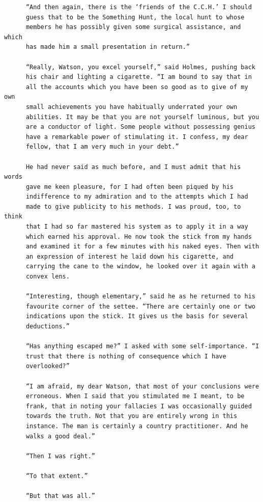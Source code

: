 \documentclass{article}
\begin{document}
\begin{verbatim}
      “And then again, there is the ‘friends of the C.C.H.’ I should
      guess that to be the Something Hunt, the local hunt to whose
      members he has possibly given some surgical assistance, and which
      has made him a small presentation in return.”

      “Really, Watson, you excel yourself,” said Holmes, pushing back
      his chair and lighting a cigarette. “I am bound to say that in
      all the accounts which you have been so good as to give of my own
      small achievements you have habitually underrated your own
      abilities. It may be that you are not yourself luminous, but you
      are a conductor of light. Some people without possessing genius
      have a remarkable power of stimulating it. I confess, my dear
      fellow, that I am very much in your debt.”

      He had never said as much before, and I must admit that his words
      gave me keen pleasure, for I had often been piqued by his
      indifference to my admiration and to the attempts which I had
      made to give publicity to his methods. I was proud, too, to think
      that I had so far mastered his system as to apply it in a way
      which earned his approval. He now took the stick from my hands
      and examined it for a few minutes with his naked eyes. Then with
      an expression of interest he laid down his cigarette, and
      carrying the cane to the window, he looked over it again with a
      convex lens.

      “Interesting, though elementary,” said he as he returned to his
      favourite corner of the settee. “There are certainly one or two
      indications upon the stick. It gives us the basis for several
      deductions.”

      “Has anything escaped me?” I asked with some self-importance. “I
      trust that there is nothing of consequence which I have
      overlooked?”

      “I am afraid, my dear Watson, that most of your conclusions were
      erroneous. When I said that you stimulated me I meant, to be
      frank, that in noting your fallacies I was occasionally guided
      towards the truth. Not that you are entirely wrong in this
      instance. The man is certainly a country practitioner. And he
      walks a good deal.”

      “Then I was right.”

      “To that extent.”

      “But that was all.”


\end{verbatim}
\end{document}

